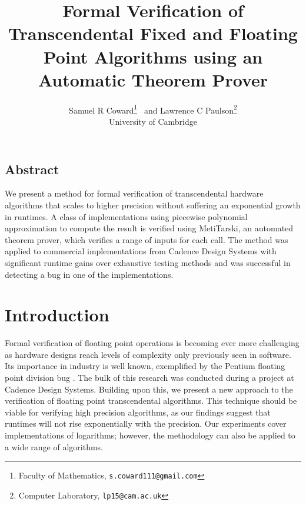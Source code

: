 \documentclass[a4]{article}
\begin{document}
\title{Formal Verification of Transcendental Fixed and Floating Point Algorithms using an Automatic Theorem Prover}
\author{Samuel R Coward\footnote{Faculty of Mathematics, \texttt{s.coward111@gmail.com}} \ and Lawrence C Paulson\footnote{Computer Laboratory, \texttt{lp15@cam.ac.uk}} \\
      University of Cambridge}

\maketitle

\normalsize
\begin{center}
\section*{Abstract}
\end{center}

We present a method for formal verification of transcendental hardware algorithms that scales to higher precision without suffering an exponential growth in runtimes. A class of implementations using piecewise polynomial approximation to compute the result is verified using MetiTarski, an automated theorem prover, which verifies a range of inputs for each call. The method was applied to commercial implementations from Cadence Design Systems with significant runtime gains over exhaustive testing methods and was successful in detecting a bug in one of the implementations.  

\section{Introduction}

Formal verification of floating point operations is becoming ever more challenging as hardware designs reach levels of complexity only previously seen in software. Its importance in industry is well known, exemplified by the Pentium floating point division bug \cite{pratt1995anatomy}. The bulk of this research was conducted during a project at Cadence Design Systems. Building upon this, we present a new approach to the verification of floating point transcendental algorithms. This technique should be viable for verifying high precision algorithms, as our findings suggest that runtimes will not rise exponentially with the precision.  Our experiments cover implementations of logarithms; however, the methodology can also be applied to a wide range of algorithms. 
\end{document}
